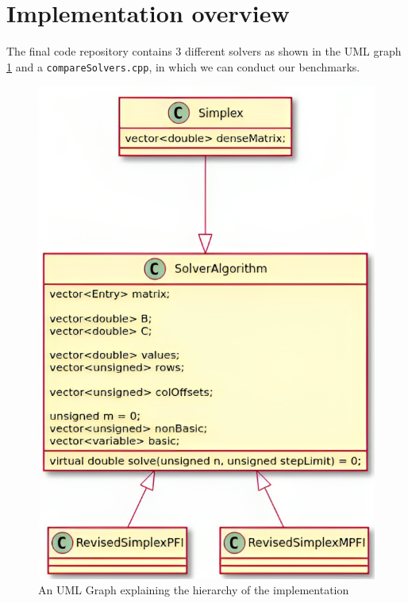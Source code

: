 \section{Implementation overview}
The final code repository contains 3 different solvers as shown in the
UML graph \ref{fig:hierarchy}
and a \verb|compareSolvers.cpp|, in which we can conduct our benchmarks.
\begin{figure}[htpb]
    \centering
    \includegraphics[height=0.6\textheight]{figures/UML.png}
    \caption{An UML Graph explaining the hierarchy of the implementation}
    \label{fig:hierarchy}
\end{figure}

